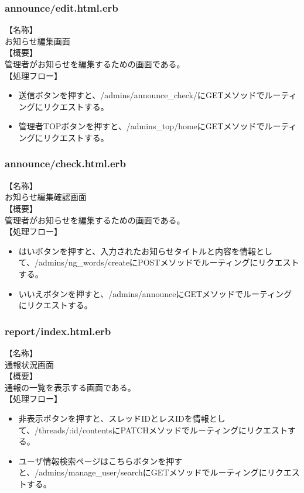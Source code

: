 \documentclass[a4j]{jarticle}
\begin{document}
\subsubsection{announce/edit.html.erb}
\noindent
【名称】\\
お知らせ編集画面\\
【概要】\\
管理者がお知らせを編集するための画面である。\\
【処理フロー】
\begin{itemize}
  \item 送信ボタンを押すと、/admins/announce\_check/にGETメソッドでルーティングにリクエストする。
  \item 管理者TOPボタンを押すと、/admins\_top/homeにGETメソッドでルーティングにリクエストする。
\end{itemize}

\subsubsection{announce/check.html.erb}
\noindent
【名称】\\
お知らせ編集確認画面\\
【概要】\\
管理者がお知らせを編集するための画面である。\\
【処理フロー】
\begin{itemize}
  \item はいボタンを押すと、入力されたお知らせタイトルと内容を情報として、/admins/ng\_words/createにPOSTメソッドでルーティングにリクエストする。
  \item いいえボタンを押すと、/admins/announceにGETメソッドでルーティングにリクエストする。
\end{itemize}


\subsubsection{report/index.html.erb}
\noindent
【名称】\\
通報状況画面\\
【概要】\\
通報の一覧を表示する画面である。\\
【処理フロー】
\begin{itemize}
  \item 非表示ボタンを押すと、スレッドIDとレスIDを情報として、/threads/:id/contentsにPATCHメソッドでルーティングにリクエストする。
  \item ユーザ情報検索ページはこちらボタンを押すと、/admins/manage\_user/searchにGETメソッドでルーティングにリクエストする。
\end{itemize}
\end{document}
